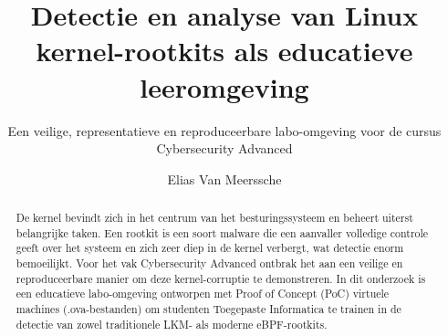 \documentclass[a0,portrait]{hogent-poster}
\title{Detectie en analyse van Linux kernel-rootkits als educatieve leeromgeving}
\subtitle{Een veilige, representatieve en reproduceerbare labo-omgeving voor de cursus Cybersecurity Advanced}
\author{Elias Van Meerssche}
\begin{document}
    
    \maketitle
    
    \begin{abstract}
        De kernel bevindt zich in het centrum van het besturingssysteem en beheert uiterst belangrijke taken. Een rootkit is een soort malware die een aanvaller volledige controle geeft over het systeem en zich zeer diep in de kernel verbergt, wat detectie enorm bemoeilijkt. Voor het vak Cybersecurity Advanced ontbrak het aan een veilige en reproduceerbare manier om deze kernel-corruptie te demonstreren. In dit onderzoek is een educatieve labo-omgeving ontworpen met Proof of Concept (PoC) virtuele machines (.ova-bestanden) om studenten Toegepaste Informatica te trainen in de detectie van zowel traditionele LKM- als moderne eBPF-rootkits.
    \end{abstract}
    
\end{document}
